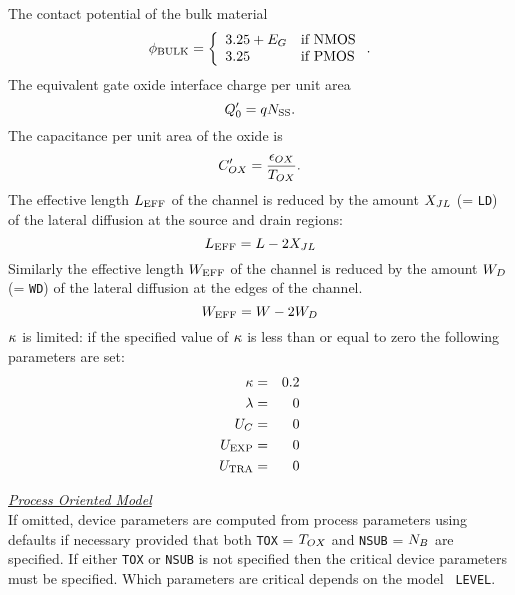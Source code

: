 \noindent The contact potential of the bulk material
\begin{equation}
\phi_{\mbox{\scriptsize BULK}} = \left\{ \begin{array}{ll}
                          3.25 + E_G & \mbox{if NMOS}\\
                          3.25       & \mbox{if PMOS}
                          \end{array} \right. .
\end{equation}
The equivalent gate oxide interface charge per unit area
\begin{equation}
Q'_0 = qN_{\mbox{\scriptsize SS}} .
\end{equation}
The capacitance per unit area of the oxide is
\begin{equation}
C'_{OX} = {{\epsilon_{OX}} \over { T_{OX}}} .
\end{equation}
The effective length $L_{\mbox{\scriptsize EFF}}$ of the channel is reduced by the
amount $X_{JL}$ (= {\tt LD}) of the lateral diffusion at the source and drain
regions:
\begin{equation}
L_{\mbox{\scriptsize EFF}} = L - 2X_{JL}
\end{equation}
Similarly the effective length $W_{\mbox{\scriptsize EFF}}$ of the channel is reduced by the
amount $W_D$ (= {\tt WD}) of the lateral diffusion at the edges of the
channel.
\begin{equation}
W_{\mbox{\scriptsize EFF}} = W - 2W_D
\end{equation}
$\kappa$ is limited:
if the specified value of $\kappa$ is
less than or equal to zero the following parameters are set:
\begin{eqnarray}
\kappa &=& 0.2\\
\lambda &=& 0\\
U_C &=& 0\\
U_{\mbox{\scriptsize EXP}} &=& 0\\
U_{\mbox{\scriptsize TRA}} &=& 0
\end{eqnarray}

\noindent\underline{\sl \large Process Oriented Model}
\\[0.1in]
If omitted, device parameters are computed from process parameters using
defaults if necessary provided that both {\tt TOX} = $T_{OX}$ and
{\tt NSUB} = $N_B$ are specified.  If either
{\tt TOX} or {\tt NSUB} is not specified then the critical device parameters
must be specified.  Which parameters are critical depends on the model {\tt
LEVEL}.


